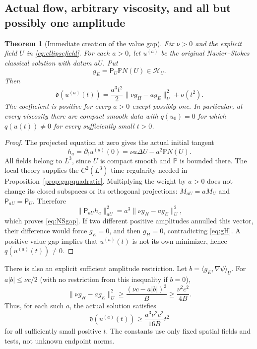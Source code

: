 \documentclass[11pt,a4paper]{article}
\newtheorem{theorem}{Theorem}[section]
\theoremstyle{definition}\newtheorem{definition}[theorem]{Definition}
\theoremstyle{remark}\newtheorem{remark}[theorem]{Remark}
\newcommand{\PP}{\mathbb P}
\newcommand{\HH}{\mathcal H}
\newcommand{\GP}{\mathsf P}
\newcommand{\norm}[1]{\lVert #1\rVert}
\newcommand{\ip}[2]{\langle #1,#2\rangle}
\numberwithin{equation}{section}
\begin{document}
\subsection{Actual flow, arbitrary viscosity, and all but possibly one amplitude}
\begin{theorem}[Immediate creation of the value gap]\label{thm:NSdeparture}
Fix $\nu>0$ and the explicit field $U$ in \eqref{eq:ellipsefield}. For each $a>0$, let $u^{(a)}$ be the original Navier--Stokes classical solution with datum $aU$. Put
\[
 g_E=\GP_U\PP N(U)\in\HH_U.
\]
Then
\begin{equation}\label{eq:NSgap}
 \mathfrak d(u^{(a)}(t))
 =\frac{a^3t^2}{2}\norm{\nu g_H-a g_E}_U^2+o(t^2).
\end{equation}
The coefficient is positive for every $a>0$ except possibly one. In particular, at every viscosity there are compact smooth data with $q(u_0)=0$ for which $q(u(t))\ne0$ for every sufficiently small $t>0$.
\end{theorem}
\begin{proof}
The projected equation at zero gives the actual initial tangent
\[
 h_a=\partial_tu^{(a)}(0)
     =\nu a\Delta U-a^2\PP N(U).
\]
All fields belong to $L^3$, since $U$ is compact smooth and $\PP$ is bounded there. The local theory supplies the $C^2(L^3)$ time regularity needed in Proposition~\ref{prop:gapquadratic}. Multiplying the weight by $a>0$ does not change its closed subspaces or its orthogonal projections:
$M_{aU}=aM_U$ and $\GP_{aU}=\GP_U$. Therefore
\[
 \norm{\GP_{aU}h_a}_{aU}^2
 =a^3\norm{\nu g_H-a g_E}_U^2,
\]
which proves \eqref{eq:NSgap}. If two different positive amplitudes annulled this vector, their difference would force $g_E=0$, and then $g_H=0$, contradicting \eqref{eq:gH}. A positive value gap implies that $u^{(a)}(t)$ is not its own minimizer, hence $q(u^{(a)}(t))\ne0$.
\end{proof}

There is also an explicit sufficient amplitude restriction. Let
$b=\ip{g_E}{\nabla\psi}_U$. For $a|b|\le\nu c/2$ (with no restriction from this inequality if $b=0$),
\[
 \norm{\nu g_H-a g_E}_U^2
 \ge\frac{(\nu c-a|b|)^2}{B}
 \ge\frac{\nu^2c^2}{4B}.
\]
Thus, for each such $a$, the actual solution satisfies
\begin{equation}\label{eq:NSgaplower}
 \mathfrak d(u^{(a)}(t))\ge\frac{a^3\nu^2c^2}{16B}t^2
\end{equation}
for all sufficiently small positive $t$. The constants use only fixed spatial fields and tests, not unknown endpoint norms.
\end{document}
